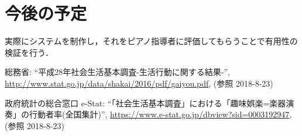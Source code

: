 \documentclass[twocolumn,10pt,a4j]{jsarticle}
\begin{document}
\section{今後の予定}
実際にシステムを制作し，それをピアノ指導者に評価してもらうことで有用性の検証を行う．

\begin{thebibliography}{99}
 総務省: ``平成28年社会生活基本調査-生活行動に関する結果-'', \url{http://www.stat.go.jp/data/shakai/2016/pdf/gaiyou.pdf}, (参照 2018-8-23)

 政府統計の総合窓口 e-Stat: ``「社会生活基本調査」における「趣味娯楽=楽器演奏」の行動者率(全国集計)'', \url{https://www.e-stat.go.jp/dbview?sid=0003192947}, (参照 2018-8-23)

\end{thebibliography}
\end{document}
